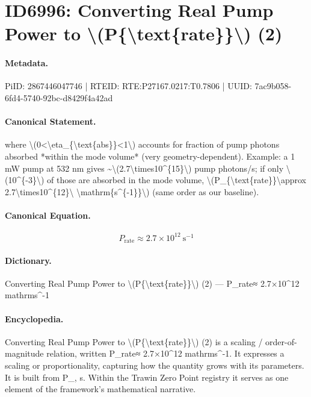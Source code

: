 \section*{ID6996: Converting Real Pump Power to \textbackslash{}(P\{\textbackslash{}text\{rate\}\}\textbackslash{}) (2)}
\paragraph{Metadata.}
PiID: 2867446047746 | RTEID: RTE:P27167.0217:T0.7806 | UUID: 7ac9b058-6fd4-5740-92bc-d8429f4a42ad

\paragraph{Canonical Statement.}
where \textbackslash{}(0<\textbackslash{}eta\_\{\textbackslash{}text\{abs\}\}<1\textbackslash{}) accounts for fraction of pump photons absorbed *within the mode volume* (very geometry-dependent). Example: a 1 mW pump at 532 nm gives \textasciitilde{}\textbackslash{}(2.7\textbackslash{}times10\textasciicircum{}\{15\}\textbackslash{}) pump photons/s; if only \textbackslash{}(10\textasciicircum{}\{-3\}\textbackslash{}) of those are absorbed in the mode volume, \textbackslash{}(P\_\{\textbackslash{}text\{rate\}\}\textbackslash{}approx 2.7\textbackslash{}times10\textasciicircum{}\{12\}\textbackslash{} \textbackslash{}mathrm\{s\textasciicircum{}\{-1\}\}\textbackslash{}) (same order as our baseline).

\paragraph{Canonical Equation.}
\[
P_{\text{rate}}\approx 2.7\times10^{12}\ \mathrm{s^{-1}}
\]

\paragraph{Dictionary.}
Converting Real Pump Power to \textbackslash{}(P\{\textbackslash{}text\{rate\}\}\textbackslash{}) (2) — P\_rate≈ 2.7×10\textasciicircum{}12 mathrms\textasciicircum{}-1

\paragraph{Encyclopedia.}
Converting Real Pump Power to \textbackslash{}(P\{\textbackslash{}text\{rate\}\}\textbackslash{}) (2) is a scaling / order-of-magnitude relation, written P\_rate≈ 2.7×10\textasciicircum{}12 mathrms\textasciicircum{}-1. It expresses a scaling or proportionality, capturing how the quantity grows with its parameters. It is built from P\_, s. Within the Trawin Zero Point registry it serves as one element of the framework's mathematical narrative.
